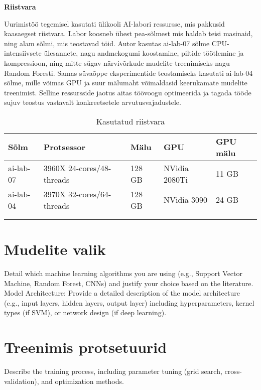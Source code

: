 \textbf{Riistvara}\nopagebreak[4]

Uurimistöö tegemisel kasutati ülikooli AI-labori ressursse, mis pakkusid kaasaegset riistvara. Labor koosneb ühest pea-sõlmest mis haldab teisi masinaid, ning alam sõlmi, mis teostavad töid. Autor kasutas ai-lab-07 sõlme CPU-intensiivsete ülesannete, nagu andmekogumi koostamine, piltide töötlemine ja kompressioon, ning mitte sügav närvivõrkude mudelite treenimiseks nagu Random Foresti. Samas süvaõppe eksperimentide teostamiseks kasutati ai-lab-04 sõlme, mille võimas GPU ja suur mälumaht võimaldasid keerukamate mudelite treenimist. Selline ressursside jaotus aitas töövoogu optimeerida ja tagada tööde sujuv teostus vastavalt konkreetsetele arvutusvajadustele.
\begin{longtable}{lllll}
    \hline
    Sõlm & Protsessor & Mälu & GPU & GPU mälu                         \\ 
    \hline
    ai-lab-07 & 3960X 24-cores/48-threads & 128 GB & NVidia 2080Ti & 11 GB    \\
    ai-lab-04 & 3970X 32-cores/64-threads & 128 GB & NVidia 3090 & 24 GB      \\
    &              &                    &                              \\ \hline
    \caption{Kasutatud riistvara}
    \label{tab:hardwareused}
\end{longtable}



\section{Mudelite valik}
Detail which machine learning algorithms you are using (e.g., Support Vector Machine, Random Forest, CNNs) and justify your choice based on the literature.
Model Architecture: Provide a detailed description of the model architecture (e.g., input layers, hidden layers, output layer) including hyperparameters, kernel types (if SVM), or network design (if deep learning).
\section{Treenimis protsetuurid}
Describe the training process, including parameter tuning (grid search, cross-validation), and optimization methods.